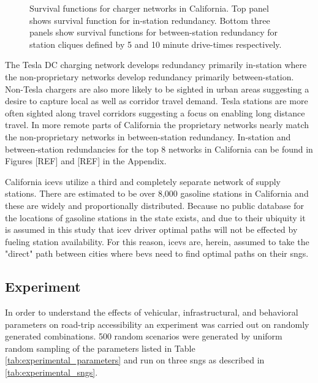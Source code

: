 \documentclass[11pt]{article}
\begin{document}
\begin{multicols}{2}
\begin{figure}[H]
\begin{subfigure}{\linewidth}
	\end{subfigure}
	\caption{Survival functions for charger networks in California. Top panel shows survival function for in-station redundancy. Bottom three panels show survival functions for between-station redundancy for station cliques defined by 5 and 10 minute drive-times respectively.}
	\label{fig:network_histograms}
\end{figure}

The Tesla DC charging network develops redundancy primarily in-station where the non-proprietary networks develop redundancy primarily between-station. Non-Tesla chargers are also more likely to be sighted in urban areas suggesting a desire to capture local as well as corridor travel demand. Tesla stations are more often sighted along travel corridors suggesting a focus on enabling long distance travel. In more remote parts of California the proprietary networks nearly match the non-proprietary networks in between-station redundancy. In-station and between-station redundancies for the top 8 networks in California can be found in Figures [REF] and [REF] in the Appendix.

California \glspl{icev} utilize a third and completely separate network of supply stations. There are estimated to be over 8,000 gasoline stations in California \cite{CEC_2022} and these are widely and proportionally distributed. Because no public database for the locations of gasoline stations in the state exists, and due to their ubiquity it is assumed in this study that \gls{icev} driver optimal paths will not be effected by fueling station availability. For this reason, \glspl{icev} are, herein, assumed to take the "direct" path between cities where \glspl{bev} need to find optimal paths on their \glspl{sng}.

\subsection*{Experiment}

In order to understand the effects of vehicular, infrastructural, and behavioral parameters on road-trip accessibility an experiment was carried out on randomly generated combinations. 500 random scenarios were generated by uniform random sampling of the parameters listed in Table \ref{tab:experimental_parameters} and run on three \glspl{sng} as described in \ref{tab:experimental_sngs}.


\end{multicols}
\end{document}
